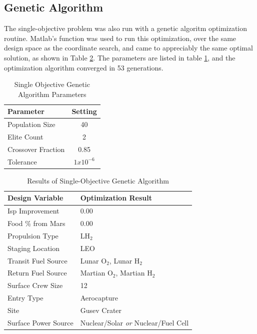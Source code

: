 \documentclass[]{aiaa-pretty}
\begin{document}
\subsection{Genetic Algorithm}
\label{sec:gasingle}


The single-objective problem was also run with a genetic algoritm optimization routine. Matlab's  function was used to run this optimization, over the same design space as the coordinate search, and came to appreciably the same optimal solution, as shown in Table \ref{tab:GAsingle}. The  parameters are listed in table \ref{tab:gasingleparams}, and the optimization algorithm converged in 53 generations.

\begin{table}[h]
	\centering
	\caption{Single Objective Genetic Algorithm Parameters}
	\label{tab:gasingleparams}
	\begin{tabular}{lc}
		\textbf{Parameter} & \textbf{Setting} \\ \hline
		Population Size & 40\\
		Elite Count & 2\\
		Crossover Fraction & 0.85\\
		Tolerance & $1x10^{-6}$\\
	\end{tabular}
	\end{table}

\begin{table}[h!]
	\centering
	\caption{Results of Single-Objective Genetic Algorithm}
	\label{tab:GAsingle}
	\begin{tabular}{ll}
	\textbf{Design Variable} & \textbf{Optimization Result}\\ \hline
	Isp Improvement & 0.00 \\
	Food \% from Mars & 0.00 \\
	Propulsion Type & LH$_2$ \\
	Staging Location & LEO \\
	Transit Fuel Source & Lunar O$_2$, Lunar H$_2$ \\
	Return Fuel Source & Martian O$_2$, Martian H$_2$ \\
	Surface Crew Size & 12\\
	Entry Type & Aerocapture \\
	Site & Gusev Crater \\
	Surface Power Source & Nuclear/Solar \textit{or} Nuclear/Fuel Cell\\
	\end{tabular}
\end{table}
\end{document}
